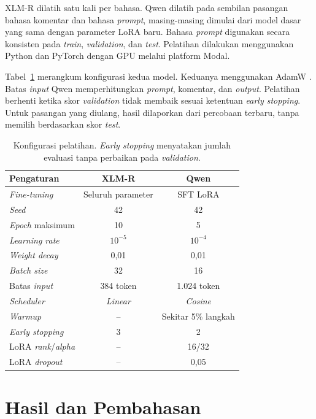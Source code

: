 \documentclass[11pt]{article}
\begin{document}
XLM-R dilatih satu kali per bahasa. Qwen dilatih pada sembilan pasangan bahasa komentar dan bahasa \textit{prompt}, masing-masing dimulai dari model dasar yang sama dengan parameter LoRA baru. Bahasa \textit{prompt} digunakan secara konsisten pada \textit{train}, \textit{validation}, dan \textit{test}. Pelatihan dilakukan menggunakan Python dan PyTorch dengan GPU melalui platform Modal.

Tabel~\ref{tab:configuration} merangkum konfigurasi kedua model. Keduanya menggunakan AdamW \citep{loshchilov-hutter-2019-decoupled}. Batas \textit{input} Qwen memperhitungkan \textit{prompt}, komentar, dan \textit{output}. Pelatihan berhenti ketika skor \textit{validation} tidak membaik sesuai ketentuan \textit{early stopping}. Untuk pasangan yang diulang, hasil dilaporkan dari percobaan terbaru, tanpa memilih berdasarkan skor \textit{test}.

\begin{table}[t]
\centering\small
\setlength{\tabcolsep}{2.5pt}
\begin{tabular}{lcc}
\toprule
Pengaturan & XLM-R & Qwen \\
\midrule
\textit{Fine-tuning} & Seluruh parameter & SFT LoRA \\
\textit{Seed} & 42 & 42 \\
\textit{Epoch} maksimum & 10 & 5 \\
\textit{Learning rate} & $10^{-5}$ & $10^{-4}$ \\
\textit{Weight decay} & 0,01 & 0,01 \\
\textit{Batch size} & 32 & 16 \\
Batas \textit{input} & 384 token & 1.024 token \\
\textit{Scheduler} & \textit{Linear} & \textit{Cosine} \\
\textit{Warmup} & -- & Sekitar 5\% langkah \\
\textit{Early stopping} & 3 & 2 \\
LoRA \textit{rank}/\textit{alpha} & -- & 16/32 \\
LoRA \textit{dropout} & -- & 0,05 \\
\bottomrule
\end{tabular}
\caption{Konfigurasi pelatihan. \textit{Early stopping} menyatakan jumlah evaluasi tanpa perbaikan pada \textit{validation}.}
\label{tab:configuration}
\end{table}

\section{Hasil dan Pembahasan}
\end{document}
